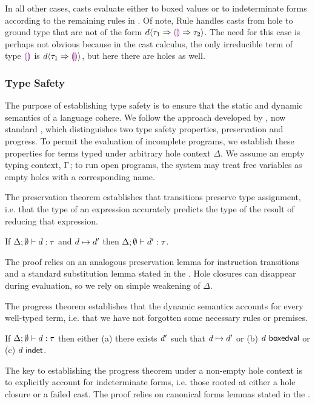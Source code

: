 In all other cases, casts evaluate either to boxed values or to
indeterminate forms according to the remaining rules
in .
%
Of note, Rule  handles casts from hole to
ground type that are not of
the form $d \langle{\tau_1}\Rightarrow{\textcolor{violet}{\llparenthesis}\textcolor{violet}{\rrparenthesis}}\Rightarrow{\tau_2}\rangle$.
%
The need for this case is perhaps not obvious because in the cast calculus,  the only irreducible term of type $\textcolor{violet}{\llparenthesis}\textcolor{violet}{\rrparenthesis}$
is $d \langle{\tau_1}\Rightarrow{\textcolor{violet}{\llparenthesis}\textcolor{violet}{\rrparenthesis}}\rangle$, but here there are holes as well.

\subsubsection{Type Safety}
%
The purpose of establishing type safety is to ensure that the static and dynamic semantics of a
language cohere.
%
We follow the approach developed by \citet{wright94:_type_soundness},
now standard \cite{pfpl}, which distinguishes two type safety
properties, preservation and progress.
%
To permit the evaluation of incomplete programs, we establish these
properties for terms typed under arbitrary hole context $\Delta$.
%
We assume an empty typing context, $\Gamma$; to run open programs, the
system may treat free variables as empty holes with a corresponding
name.

The preservation theorem establishes that transitions preserve type
assignment, i.e. that the type of an expression accurately predicts
the type of the result of reducing that expression.

\begin{thm}[Preservation]
  If $\Delta; \emptyset \vdash d : \tau$ and
  $d \mapsto d'$ then
  $\Delta; \emptyset \vdash d' : \tau$.
\end{thm}
\noindent
%
The proof relies on an analogous preservation lemma for instruction
transitions and a standard substitution lemma stated in
the \appendixName.
%
Hole closures can disappear during evaluation, so we rely on simple weakening
of $\Delta$.

The progress theorem establishes that the dynamic semantics accounts
for every well-typed term, i.e. that we have not forgotten some
necessary rules or premises.
%
\begin{thm}[Progress]
  If $\Delta; \emptyset \vdash d : \tau$ then either
  (a) there exists $d'$ such that $d \mapsto d'$ or
  (b) $d~\mathsf{boxedval}$ or
  (c) $d~\mathsf{indet}$.
\end{thm}
\noindent
The key to establishing the progress theorem under a non-empty hole
context is to explicitly account for indeterminate forms,
i.e. those rooted at either a hole closure or a failed cast.
%
The proof relies on canonical forms lemmas stated in the \appendixName.

